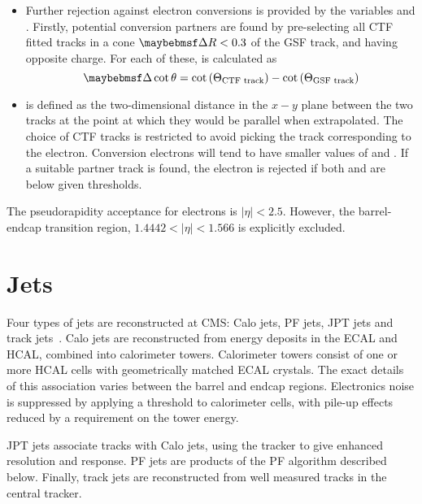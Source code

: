 \begin{itemize}
\item Further rejection against electron conversions is provided by the
  variables \Distnm and \DeltaCotThetanm. Firstly, potential conversion partners
  are found by pre-selecting all \ac{CTF} fitted tracks in a cone $\DeltaR <
  0.3$ of the \ac{GSF} track, and having opposite charge. For each of these,
  \DeltaCotThetanm is calculated as
\begin{equation*}
  \DeltaCotThetanm = \cot\left(\Theta_{\textrm{CTF track}}\right) - \cot\left(\Theta_{\textrm{GSF track}}\right)
\end{equation*}
\item \Distnm is defined as the two-dimensional distance in the $x-y$ plane between the
two tracks at the point at which they would be parallel when extrapolated. The
choice of \ac{CTF} tracks is restricted to avoid picking the track corresponding
to the electron. Conversion electrons will tend to have smaller values of
\DeltaCotTheta and \Dist. If a suitable partner track is found, the electron is
rejected if both \Dist and \DeltaCotTheta are below given thresholds.
\end{itemize}

The pseudorapidity acceptance for electrons is $|\eta| < 2.5$. However, the
barrel-endcap transition region, $1.4442 < |\eta| < 1.566$ is explicitly excluded.



\section{Jets}
\label{sec:reco_jets}
Four types of jets are reconstructed at \ac{CMS}: \acf{Calo} jets, \ac{PF} jets,
\ac{JPT} jets and track jets~\cite{jet_perf_pas}. \ac{Calo} jets are
reconstructed from energy deposits in the \ac{ECAL} and \ac{HCAL}, combined into
calorimeter towers. Calorimeter towers consist of one or more \ac{HCAL} cells
with geometrically matched \ac{ECAL} crystals. The exact details of this
association varies between the barrel and endcap regions. Electronics noise is
suppressed by applying a threshold to calorimeter cells, with pile-up effects
reduced by a requirement on the tower energy.

\ac{JPT} jets associate tracks with \ac{Calo} jets, using the tracker to give
enhanced \Pt resolution and response. \ac{PF} jets are products of the \acl{PF}
algorithm described below. Finally, track jets are reconstructed from well
measured tracks in the central tracker.

